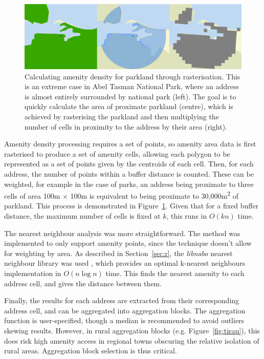 \documentclass[12pt,a4paper]{article}
\begin{document}
\begin{figure}[tt]
	\begin{center}
		\includegraphics[width=180mm]{./figures/rasterisation.png}
		\caption{\centering Calculating amenity density for parkland through rasterisation. This is an extreme case in Abel Tasman National Park, where an address is almost entirely surrounded by national park (left). The goal is to quickly calculate the area of proximate parkland (centre), which is achieved by rasterising the parkland and then multiplying the number of cells in proximity to the address by their area (right).}
		\label{fig:raster}
	\end{center}
\end{figure}


Amenity density processing requires a set of points, so amenity area data is first rasterised to produce a set of amenity cells, allowing each polygon to be represented as a set of points given by the centroids of each cell. Then, for each address, the number of points within a buffer distance is counted. These can be weighted, for example in the case of parks, an address being proximate to three cells of area 100m $\times$ 100m is equivalent to being proximate to 30,000m\textsuperscript{2} of parkland. This process is demonstrated in Figure~\ref{fig:raster}. Given that for a fixed buffer distance, the maximum number of cells is fixed at $k$, this runs in $O(kn)$ time.

The nearest neighbour analysis was more straightforward. The method was implemented to only support amenity points, since the technique doesn't allow for weighting by area. As described in Section~\ref{sec:r}, the \emph{libnabo} nearest neighbour library was used \citep{libnabo:2012}, which provides an optimal k-nearest neighbours implementation in $O(n\log n)$ time. This finds the nearest amenity to each address cell, and gives the distance between them.

Finally, the results for each address are extracted from their corresponding address cell, and can be aggregated into aggregation blocks. The aggregation function is user-specified, though a median is recommended to avoid outliers skewing results. However, in rural aggregation blocks (e.g. Figure~\ref{fig:tirau}), this does risk high amenity access in regional towns obscuring the relative isolation of rural areas. Aggregation block selection is thus critical.
\end{document}

